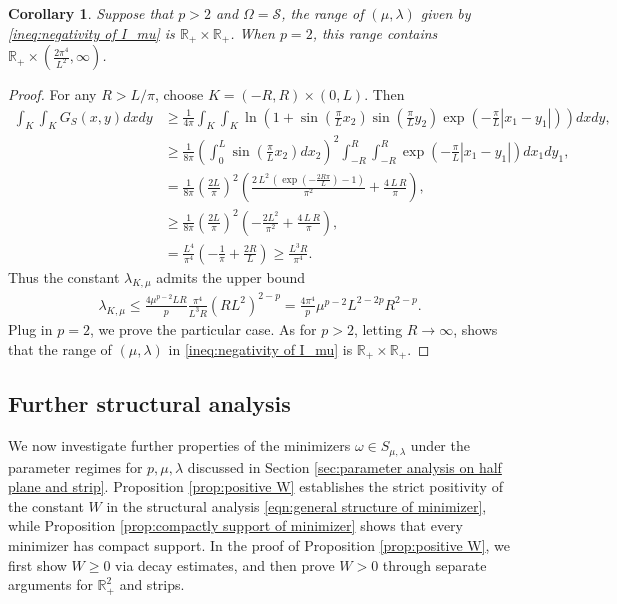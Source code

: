 \documentclass[11pt,letterpaper]{amsart}
\newtheorem{cor}[thm]{Corollary}
\theoremstyle{definition}
\theoremstyle{remark}
\renewcommand{\S}{\mathcal{S}}
\newcommand{\R}{\mathbb{R}}
\renewcommand{\O}{\Omega}
\numberwithin{equation}{section}
\begin{document}
\begin{cor}\label{cor:range of mu and lambda Omega=S}
    Suppose that $p > 2$ and $\O=\S$, the range of $(\mu,\lambda)$ given by \eqref{ineq:negativity of I_mu} is $\R_+ \times \R_+$. When $p=2$, this range contains $\R_+ \times (\frac{2\pi^4}{L^2},\infty)$.
\end{cor}
\begin{proof}
    For any $R>L/\pi$, choose $K=(-R, R) \times (0, L)$. Then 
    \begin{align*}
        \int_{K}\int_{K} G_S(x,y)dxdy & \geq \frac{1}{4\pi }\int_{K}\int_{K}\ln\left(1+\sin(\frac{\pi}{L}x_2)\sin(\frac{\pi}{L}y_2)\exp(-\frac{\pi}{L}|x_1-y_1|)\right)dxdy, \\
        & \geq \frac{1}{8\pi}\left(\int_{0}^{L}\sin(\frac{\pi}{L}x_2)dx_2\right)^2\int_{-R}^{R}\int_{-R}^{R}\exp(-\frac{\pi}{L}|x_1-y_1|)dx_1dy_1, \\
        & = \frac{1}{8\pi }\left(\frac{2L}{\pi}\right)^2 \left( \frac{2\,L^2 \,{\left(\exp({-\frac{2R\pi}{L}}) -1\right)}}{\pi^2 }+\frac{4\,L\,R}{\pi } \right), \\
        & \geq \frac{1}{8\pi }\left(\frac{2L}{\pi}\right)^2 \left( -\frac{2 L^2}{\pi^2 }+\frac{4\,L\,R}{\pi } \right), \\
        & = \frac{L^4}{\pi^4} \left( -\frac{1}{\pi} + \frac{2R}{L} \right) \geq \frac{L^3 R}{\pi^4}.
    \end{align*}
    Thus the constant $\lambda_{K,\mu}$ admits the upper bound 
    \begin{align*}
        \lambda_{K,\mu}\leq \frac{4\mu^{p-2}LR}{p}\frac{\pi^4}{L^3 R}\left(R L^2\right)^{2-p} = \frac{4\pi^4}{p}\mu^{p-2}L^{2-2p}R^{2-p}.
    \end{align*}
    Plug in $p=2$, we prove the particular case. As for $p>2$, letting $R\to \infty$, shows that the range of $(\mu,\lambda)$ in \eqref{ineq:negativity of I_mu} is $\R_+\times \R_+$.
    
\end{proof}

\subsection{Further structural analysis} \label{sec:further structure analysis on half plane and strip}

We now investigate further properties of the minimizers $\omega\in S_{\mu,\lambda}$ under the parameter regimes for $p,\mu,\lambda$ discussed in Section \ref{sec:parameter analysis on half plane and strip}. Proposition \ref{prop:positive W} establishes the strict positivity of the constant $W$ in the structural analysis \eqref{eqn:general structure of minimizer}, while Proposition \ref{prop:compactly support of minimizer} shows that every minimizer has compact support. In the proof of Proposition \ref{prop:positive W}, we first show $W\ge 0$ via decay estimates, and then prove $W>0$ through separate arguments for $\mathbb{R}^2_+$ and strips.
\end{document}
